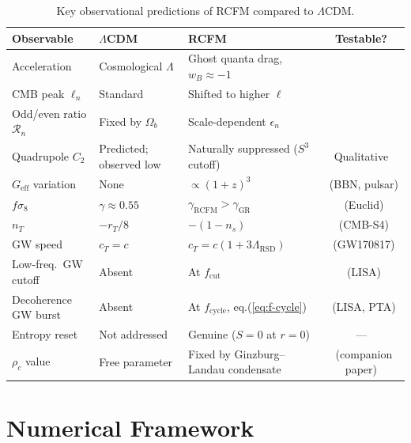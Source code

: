 \documentclass[10pt,twocolumn]{article}
\theoremstyle{definition}
\newcommand{\rhoc}{\rho_{c}}
\DeclareRobustCommand{\onecoltable}[2][]{%
  \begin{table}[#1]%
    \centering
    #2
  \end{table}%
}
\begin{document}
\onecoltable[htb]{%
 \centering
 \caption{Key observational predictions of RCFM compared to $\Lambda$CDM.}
  \label{tab:predictions}
  \begin{tabular}{p{2.8cm}p{3.5cm}p{3.5cm}c}
  \toprule
  Observable
    & $\Lambda$CDM
    & RCFM
    & Testable?\\
  \midrule
  Acceleration
    & Cosmological \( \Lambda \)
    & Ghost quanta drag, \( w_{B}\approx-1 \)
    & \checkmark\\
  CMB peak \( \ell_{n} \)
    & Standard
    & Shifted to higher \( \ell \)
    & \checkmark\\
  Odd/even ratio \( \mathcal{R}_{n} \)
    & Fixed by \( \Omega_{b} \)
    & Scale-dependent \( \epsilon_{n} \)
    & \checkmark\\
  Quadrupole \( C_{2} \)
    & Predicted; observed low
    & Naturally suppressed (\( S^{3} \) cutoff)
    & Qualitative\\
  \( G_{\mathrm{eff}} \) variation
    & None
    & \( \propto(1+z)^{3} \)
    & \checkmark\ (BBN, pulsar)\\
  \( f\sigma_{8} \)
    & \( \gamma\approx0.55 \)
    & \( \gamma_{\mathrm{RCFM}}>\gamma_{\mathrm{GR}} \)
    & \checkmark\ (Euclid)\\
  \( n_{T} \)
    & \( -r_{T}/8 \)
    & \( -(1-n_{s}) \)
    & \checkmark\ (CMB-S4)\\
  GW speed
    & \( c_{T}=c \)
    & \( c_{T}=c(1+3\Lambda_{\mathrm{RSD}}) \)
    & \checkmark\ (GW170817)\\
  Low-freq.\ GW cutoff
    & Absent
    & At \( f_{\mathrm{cut}} \)
    & \checkmark\ (LISA)\\
  Decoherence GW burst
    & Absent
    & At \( f_{\mathrm{cycle}} \), eq.\nobreakspace{}(\ref{eq:f-cycle})
    & \checkmark\ (LISA, PTA)\\
  Entropy reset
    & Not addressed
    & Genuine (\( S=0 \) at \( r=0 \))
    & ---\\
  \( \rhoc \) value
    & Free parameter
    & Fixed by Ginzburg--Landau condensate
    & \checkmark\ (companion paper)\\
  \bottomrule
  \end{tabular}
}

\section{Numerical Framework}
\label{sec:numerical}
\end{document}
